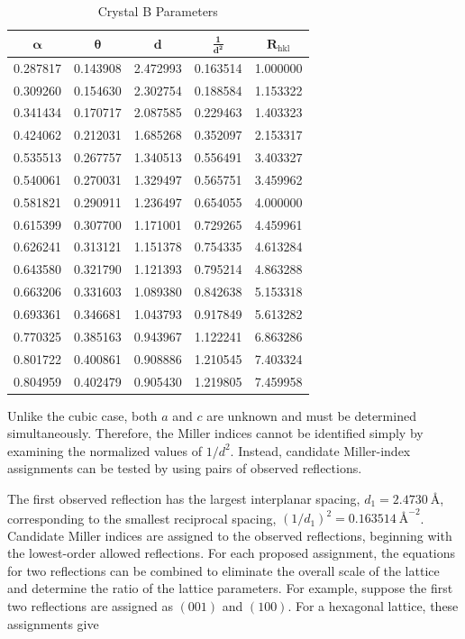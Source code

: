 \documentclass[12pt]{article}
\begin{document}
\begin{table}[ht]
    \centering
    \caption{Crystal B Parameters}
    \label{tab:crystal_B}
    \begin{tabular}{ccccc}
        \toprule
        $\mathbf{\alpha}$ & $\mathbf{\theta}$ & $\mathbf{d}$ & $\mathbf{\frac{1}{d^2}}$ & $\mathbf{R_{\mathrm{hkl}}}$ \\
        \midrule
        0.287817 & 0.143908 & 2.472993 & 0.163514 & 1.000000 \\
        0.309260 & 0.154630 & 2.302754 & 0.188584 & 1.153322 \\
        0.341434 & 0.170717 & 2.087585 & 0.229463 & 1.403323 \\
        0.424062 & 0.212031 & 1.685268 & 0.352097 & 2.153317 \\
        0.535513 & 0.267757 & 1.340513 & 0.556491 & 3.403327 \\
        0.540061 & 0.270031 & 1.329497 & 0.565751 & 3.459962 \\
        0.581821 & 0.290911 & 1.236497 & 0.654055 & 4.000000 \\
        0.615399 & 0.307700 & 1.171001 & 0.729265 & 4.459961 \\
        0.626241 & 0.313121 & 1.151378 & 0.754335 & 4.613284 \\
        0.643580 & 0.321790 & 1.121393 & 0.795214 & 4.863288 \\
        0.663206 & 0.331603 & 1.089380 & 0.842638 & 5.153318 \\
        0.693361 & 0.346681 & 1.043793 & 0.917849 & 5.613282 \\
        0.770325 & 0.385163 & 0.943967 & 1.122241 & 6.863286 \\
        0.801722 & 0.400861 & 0.908886 & 1.210545 & 7.403324 \\
        0.804959 & 0.402479 & 0.905430 & 1.219805 & 7.459958 \\
        \bottomrule
    \end{tabular}
\end{table}

Unlike the cubic case, both $a$ and $c$ are unknown and must be determined simultaneously. Therefore, the Miller indices cannot be identified simply by examining the normalized values of $1/d^2$. Instead, candidate Miller-index assignments can be tested by using pairs of observed reflections.

The first observed reflection has the largest interplanar spacing, $d_1 = 2.4730\ \text{\AA}$, corresponding to the smallest reciprocal spacing, $(1/d_1)^2 = 0.163514\ \text{\AA}^{-2}$. Candidate Miller indices are assigned to the observed reflections, beginning with the lowest-order allowed reflections. For each proposed assignment, the equations for two reflections can be combined to eliminate the overall scale of the lattice and determine the ratio of the lattice parameters. For example, suppose the first two reflections are assigned as $(001)$ and $(100)$. For a hexagonal lattice, these assignments give
\end{document}

